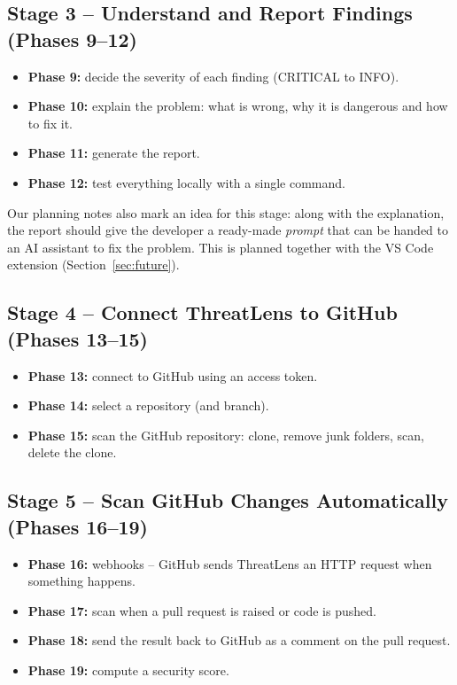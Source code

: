 \documentclass[12pt,a4paper]{article}
\begin{document}
\subsection{Stage 3 -- Understand and Report Findings (Phases 9--12)}
\begin{itemize}
    \item \textbf{Phase 9:} decide the severity of each finding (CRITICAL to INFO).
    \item \textbf{Phase 10:} explain the problem: what is wrong, why it is dangerous and how to fix it.
    \item \textbf{Phase 11:} generate the report.
    \item \textbf{Phase 12:} test everything locally with a single command.
\end{itemize}
Our planning notes also mark an idea for this stage: along with the explanation, the report should give the developer a ready-made \emph{prompt} that can be handed to an AI assistant to fix the problem. This is planned together with the VS Code extension (Section~\ref{sec:future}).

\subsection{Stage 4 -- Connect ThreatLens to GitHub (Phases 13--15)}
\begin{itemize}
    \item \textbf{Phase 13:} connect to GitHub using an access token.
    \item \textbf{Phase 14:} select a repository (and branch).
    \item \textbf{Phase 15:} scan the GitHub repository: clone, remove junk folders, scan, delete the clone.
\end{itemize}

\subsection{Stage 5 -- Scan GitHub Changes Automatically (Phases 16--19)}
\begin{itemize}
    \item \textbf{Phase 16:} webhooks -- GitHub sends ThreatLens an HTTP request when something happens.
    \item \textbf{Phase 17:} scan when a pull request is raised or code is pushed.
    \item \textbf{Phase 18:} send the result back to GitHub as a comment on the pull request.
    \item \textbf{Phase 19:} compute a security score.
\end{itemize}
\end{document}
